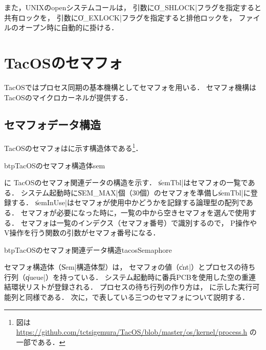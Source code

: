 また，UNIXのopenシステムコールは，
引数に\|O_SHLOCK|フラグを指定すると共有ロックを，
引数に\|O_EXLOCK|フラグを指定すると排他ロックを，
ファイルのオープン時に自動的に掛ける．

\section{TacOSのセマフォ}
TacOSではプロセス同期の基本機構としてセマフォを用いる．
セマフォ機構はTacOSのマイクロカーネルが提供する．

\subsection{セマフォデータ構造}
TacOSのセマフォはに示す構造体である\footnote{図は
\url{https://github.com/tctsigemura/TacOS/blob/master/os/kernel/process.h}
の一部である．}．

\begin{myfig}{btp}{TacOSのセマフォ構造体}{sem}

\end{myfig}

に
TacOSのセマフォ関連データの構造を示す．
\|semTbl|はセマフォの一覧である．
システム起動時に\|SEM_MAX|個（30個）のセマフォを準備し\|semTbl|に登録する．
\|semInUse|はセマフォが使用中かどうかを記録する論理型の配列である．
セマフォが必要になった時に，一覧の中から空きセマフォを選んで使用する．
セマフォは一覧のインデクス（セマフォ番号）で識別するので，
P操作やV操作を行う関数の引数がセマフォ番号になる．

\begin{myfig}{btp}{TacOSのセマフォ関連データ構造}{tacosSemaphore}
\end{myfig}

セマフォ構造体（\|Sem|構造体型）は，
セマフォの値（\|cnt|）とプロセスの待ち行列（\|queue|）を持っている．
システム起動時に番兵PCBを使用した空の重連結環状リストが登録される．
プロセスの待ち行列の作り方は，
に示した実行可能列と同様である．
次に，で表している三つのセマフォについて説明する．

